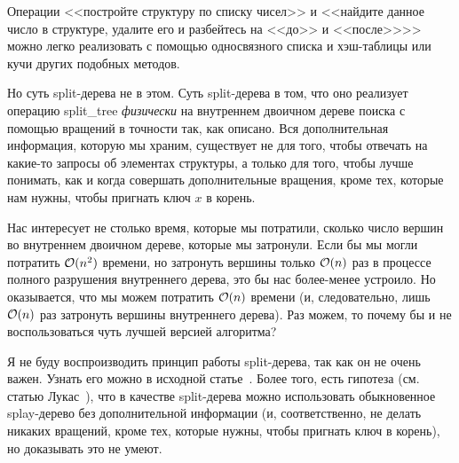
\begin{remark} Операции <<постройте структуру по списку чисел>> и <<найдите данное число в структуре, удалите его и разбейтесь на <<до>> и <<после>>>> можно легко реализовать с помощью односвязного списка и хэш-таблицы или кучи других подобных методов.

	Но суть split-дерева не в этом. Суть split-дерева в том, что оно реализует операцию \textrm{split\_tree} \emph{физически} на внутреннем двоичном дереве поиска с помощью вращений в точности так, как описано. Вся дополнительная информация, которую мы храним, существует не для того, чтобы отвечать на какие-то запросы об элементах структуры, а только для того, чтобы лучше понимать, как и когда совершать дополнительные вращения, кроме тех, которые нам нужны, чтобы пригнать ключ $x$ в корень.

	Нас интересует не столько время, которые мы потратили, сколько число вершин во внутреннем двоичном дереве, которые мы затронули. Если бы мы могли потратить $\mathcal{O}(n^2)$ времени, но затронуть вершины только $\mathcal{O}(n)$ раз в процессе полного разрушения внутреннего дерева, это бы нас более-менее устроило. Но оказывается, что мы можем потратить $\mathcal{O}(n)$ времени (и, следовательно, лишь $\mathcal{O}(n)$ раз затронуть вершины внутреннего дерева). Раз можем, то почему бы и не воспользоваться чуть лучшей версией алгоритма?

	Я не буду воспроизводить принцип работы split-дерева, так как он не очень важен. Узнать его можно в исходной статье~\cite{demaine2009geometry}. Более того, есть гипотеза (см. статью Лукас~\cite{lucas1988canonical}), что в качестве split-дерева можно использовать обыкновенное splay-дерево без дополнительной информации (и, соответственно, не делать никаких вращений, кроме тех, которые нужны, чтобы пригнать ключ в корень), но доказывать это не умеют.
\end{remark}

